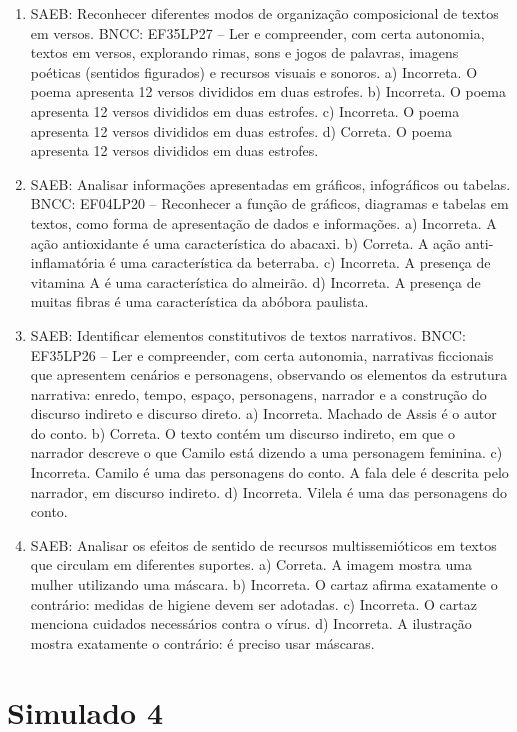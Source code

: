 \begin{enumerate}
\item
SAEB: Reconhecer diferentes modos de organização composicional de textos em versos. BNCC: EF35LP27 -- Ler e compreender, com certa autonomia, textos em versos, explorando rimas, sons e jogos de palavras, imagens poéticas (sentidos figurados) e recursos visuais e sonoros. a) Incorreta. O poema apresenta 12 versos divididos em duas estrofes. b) Incorreta. O poema apresenta 12 versos divididos em duas estrofes. c) Incorreta. O poema apresenta 12 versos divididos em duas estrofes. d) Correta. O poema apresenta 12 versos divididos em duas estrofes.

\item
SAEB: Analisar informações apresentadas em gráficos, infográficos ou tabelas. BNCC: EF04LP20 -- Reconhecer a função de gráficos, diagramas e tabelas em textos, como forma de apresentação de dados e informações. a) Incorreta. A ação antioxidante é uma característica do abacaxi. b) Correta. A ação anti-inflamatória é uma característica da beterraba. c) Incorreta. A presença de vitamina A é uma característica do almeirão. d) Incorreta. A presença de muitas fibras é uma característica da abóbora paulista.

\item
SAEB: Identificar elementos constitutivos de textos narrativos. BNCC: EF35LP26 -- Ler e compreender, com certa autonomia, narrativas ficcionais que apresentem cenários e personagens, observando os elementos da estrutura narrativa: enredo, tempo, espaço, personagens, narrador e a construção do discurso indireto e discurso direto. a) Incorreta. Machado de Assis é o autor do conto. b) Correta. O texto contém um discurso indireto, em que o narrador descreve o que Camilo está dizendo a uma personagem feminina. c) Incorreta. Camilo é uma das personagens do conto. A fala dele é descrita pelo narrador, em discurso indireto. d) Incorreta. Vilela é uma das personagens do conto.

\item
SAEB: Analisar os efeitos de sentido de recursos multissemióticos em textos que circulam em diferentes suportes. a) Correta. A imagem mostra uma mulher utilizando uma máscara. b) Incorreta. O cartaz afirma exatamente o contrário: medidas de higiene devem ser adotadas. c) Incorreta. O cartaz menciona cuidados necessários contra o vírus. d) Incorreta. A ilustração mostra exatamente o contrário: é preciso
usar máscaras.
\end{enumerate}

\section*{Simulado 4}

